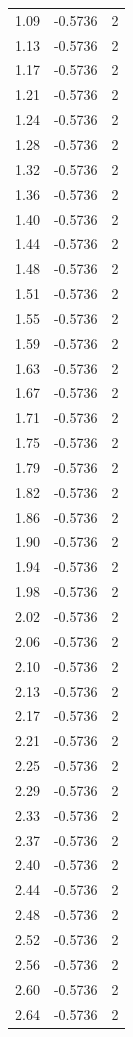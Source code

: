 \begin{longtable}{lrr}
  1.09 & -0.5736 & 2 \\
  1.13 & -0.5736 & 2 \\
  1.17 & -0.5736 & 2 \\
  1.21 & -0.5736 & 2 \\
  1.24 & -0.5736 & 2 \\
  1.28 & -0.5736 & 2 \\
  1.32 & -0.5736 & 2 \\
  1.36 & -0.5736 & 2 \\
  1.40 & -0.5736 & 2 \\
  1.44 & -0.5736 & 2 \\
  1.48 & -0.5736 & 2 \\
  1.51 & -0.5736 & 2 \\
  1.55 & -0.5736 & 2 \\
  1.59 & -0.5736 & 2 \\
  1.63 & -0.5736 & 2 \\
  1.67 & -0.5736 & 2 \\
  1.71 & -0.5736 & 2 \\
  1.75 & -0.5736 & 2 \\
  1.79 & -0.5736 & 2 \\
  1.82 & -0.5736 & 2 \\
  1.86 & -0.5736 & 2 \\
  1.90 & -0.5736 & 2 \\
  1.94 & -0.5736 & 2 \\
  1.98 & -0.5736 & 2 \\
  2.02 & -0.5736 & 2 \\
  2.06 & -0.5736 & 2 \\
  2.10 & -0.5736 & 2 \\
  2.13 & -0.5736 & 2 \\
  2.17 & -0.5736 & 2 \\
  2.21 & -0.5736 & 2 \\
  2.25 & -0.5736 & 2 \\
  2.29 & -0.5736 & 2 \\
  2.33 & -0.5736 & 2 \\
  2.37 & -0.5736 & 2 \\
  2.40 & -0.5736 & 2 \\
  2.44 & -0.5736 & 2 \\
  2.48 & -0.5736 & 2 \\
  2.52 & -0.5736 & 2 \\
  2.56 & -0.5736 & 2 \\
  2.60 & -0.5736 & 2 \\
  2.64 & -0.5736 & 2 \\

\end{longtable}
